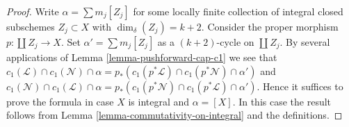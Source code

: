 \begin{proof}
Write $\alpha = \sum m_j[Z_j]$ for some locally finite
collection of integral closed subschemes $Z_j \subset X$
with $\dim_\delta(Z_j) = k + 2$.
Consider the proper morphism $p : \coprod Z_j \to X$.
Set $\alpha' = \sum m_j[Z_j]$ as a $(k + 2)$-cycle on
$\coprod Z_j$. By several applications of
Lemma \ref{lemma-pushforward-cap-c1} we see that
$c_1(\mathcal{L}) \cap c_1(\mathcal{N}) \cap \alpha
= p_*(c_1(p^*\mathcal{L}) \cap c_1(p^*\mathcal{N}) \cap \alpha')$
and
$c_1(\mathcal{N}) \cap c_1(\mathcal{L}) \cap \alpha
= p_*(c_1(p^*\mathcal{N}) \cap c_1(p^*\mathcal{L}) \cap \alpha')$.
Hence it suffices to prove the formula in case $X$ is integral
and $\alpha = [X]$. In this case the result follows
from Lemma \ref{lemma-commutativity-on-integral} and the definitions.
\end{proof}






